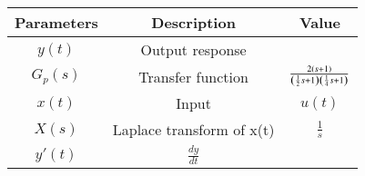 \begin{tabular}{|c|c|c|}
\hline
\textbf{Parameters} & \textbf{Description} & \textbf{Value} \\
\hline
$y(t)$ & Output response & \\
\hline
$G_p(s)$ & Transfer function & $\frac{2\left(s+1\right)}{\left(\frac{1}{2}s+1\right)\left(\frac{1}{4}s+1\right)}$\\
\hline
$x(t)$ & Input & $u(t)$ \\
\hline
	$X(s)$ & Laplace transform of x(t) & $\frac{1}{s}$\\
\hline
$y'(t)$ & $\frac{dy}{dt}$ &  \\
\hline
\end{tabular}
